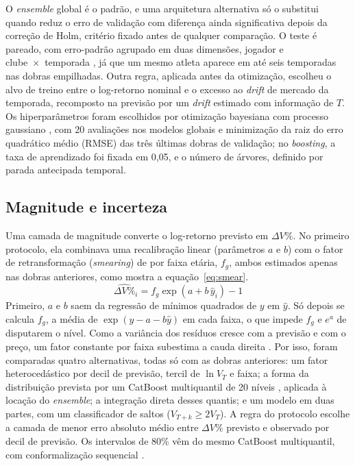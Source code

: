 \documentclass[article, 12pt, oneside, a4paper, english, brazil, section=TITLE]{abntex2}
\begin{document}
O \textit{ensemble} global é o padrão, e uma arquitetura alternativa só o substitui quando reduz o erro de validação com diferença ainda significativa depois da correção de Holm, critério fixado antes de qualquer comparação.
O teste é pareado, com erro-padrão agrupado em duas dimensões, jogador e clube~×~temporada \cite{cameron2011}, já que um mesmo atleta aparece em até seis temporadas nas dobras empilhadas.
Outra regra, aplicada antes da otimização, escolheu o alvo de treino entre o log-retorno nominal e o excesso ao \textit{drift} de mercado da temporada, recomposto na previsão por um \textit{drift} estimado com informação de $T$.
Os hiperparâmetros foram escolhidos por otimização bayesiana com processo gaussiano \cite{snoek2012}, com 20 avaliações nos modelos globais e minimização da raiz do erro quadrático médio (RMSE) das três últimas dobras de validação; no \textit{boosting}, a taxa de aprendizado foi fixada em 0,05, e o número de árvores, definido por parada antecipada temporal.

\subsection{Magnitude e incerteza}

Uma camada de magnitude converte o log-retorno previsto em $\Delta V\%$.
No primeiro protocolo, ela combinava uma recalibração linear (parâmetros $a$ e $b$) com o fator de retransformação (\textit{smearing}) de \textcite{duan1983} por faixa etária, $f_g$, ambos estimados apenas nas dobras anteriores, como mostra a equação~\eqref{eq:smear}.
\begin{equation}
  \widehat{\Delta V\%}_i = f_g \exp\left(a + b\,\hat{y}_i\right) - 1
  \label{eq:smear}
\end{equation}
Primeiro, $a$ e $b$ saem da regressão de mínimos quadrados de $y$ em $\hat y$.
Só depois se calcula $f_g$, a média de $\exp(y - a - b\hat y)$ em cada faixa, o que impede $f_g$ e $e^a$ de disputarem o nível.
Como a variância dos resíduos cresce com a previsão e com o preço, um fator constante por faixa subestima a cauda direita \cite{manning2001}.
Por isso, foram comparadas quatro alternativas, todas só com as dobras anteriores: um fator heterocedástico por decil de previsão, tercil de $\ln V_T$ e faixa; a forma da distribuição prevista por um CatBoost multiquantil de 20 níveis \cite{koenker1978}, aplicada à locação do \textit{ensemble}; a integração direta desses quantis; e um modelo em duas partes, com um classificador de saltos ($V_{T+k} \geq 2V_T$).
A regra do protocolo escolhe a camada de menor erro absoluto médio entre $\Delta V\%$ previsto e observado por decil de previsão.
Os intervalos de 80\% vêm do mesmo CatBoost multiquantil, com conformalização sequencial \cite{romano2019}.
\end{document}

